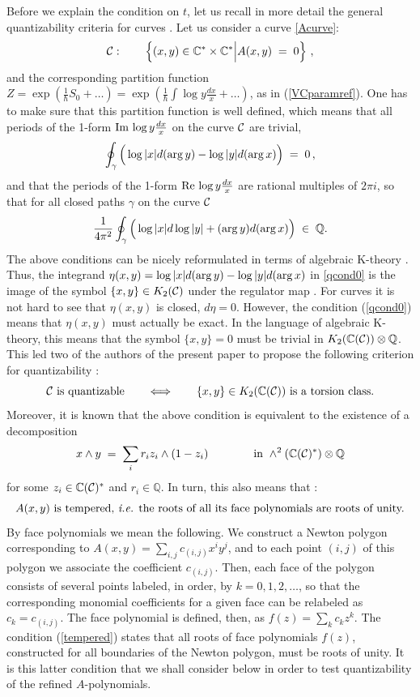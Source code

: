 \documentclass[hyper,letterpaper]{JHEP3}
\newcommand{\be}{\begin{equation}}
\newcommand{\ee}{\end{equation}}
\newcommand{\C}{{\mathbb C}}
\newcommand{\Q}{{\mathbb Q}}
\newcommand{\cC}{{\cal C }}
\begin{document}
Before we explain the condition on $t$, let us recall in more detail the general quantizability criteria for curves \cite{Apol}.
Let us consider a curve \eqref{Acurve}:
\be
\cC:\qquad \left\{(x,y)\in\mathbb{C}^*\times \mathbb{C}^*\Big|
A(x,y) \; = \; 0 \right\}\,,
\ee
and the corresponding partition function
$Z=\exp(\frac{1}{\hbar}S_0+\ldots)=\exp(\frac{1}{\hbar}\int \log y \frac{dx}{x}+\ldots)$, as in (\ref{VCparamref}).
One has to make sure that this partition function is well defined,
which means that all periods of the 1-form ${\rm Im} \, \log y \frac{dx}{x}$ on the curve $\cC$ are trivial,
\be
\oint_{\gamma} \Big( \log |x| d ({\rm arg} \, y) - \log |y| d ({\rm arg} \, x) \Big) \; = \; 0 \,,
\label{qcond0}
\ee
and that the periods of the 1-form ${\rm Re} \, \log y \frac{dx}{x}$ are rational multiples of $2 \pi i$,
so that for all closed paths $\gamma$ on the curve $\cC$
\be
\frac{1}{4 \pi^2} \oint_{\gamma} \Big( \log |x| d \log |y| + ({\rm arg} \, y) d ({\rm arg} \, x) \Big) \; \in \; \mathbb{Q} .
\label{qcondQ}
\ee
The above conditions can be nicely reformulated in terms of algebraic K-theory \cite{abmodel}.
Thus, the integrand $\eta(x,y)=\log |x| d ({\rm arg} \, y) - \log |y| d ({\rm arg} \, x)$
in \eqref{qcond0} is the image of the symbol $\{ x,y \} \in K_2 (\cC)$ under the regulator map \cite{Beilinson,Bloch}.
For curves it is not hard to see that $\eta(x,y)$ is closed, $d\eta=0$.
However, the condition (\ref{qcond0}) means that $\eta(x,y)$ must actually be exact.
In the language of algebraic K-theory, this means that the symbol $\{ x,y \} = 0$ must be trivial in $K_2 (\C (\cC)) \otimes \Q$.
This led two of the authors of the present paper to propose the following criterion for quantizability \cite{abmodel}:
\be
\cC~ \text{is quantizable} \qquad \Longleftrightarrow \qquad \{ x,y \} \in K_2 (\C (\cC)) ~\text{is a torsion class}.
\label{quantcritK2}
\ee
Moreover, it is known that the above condition is equivalent to the existence of a decomposition \cite{Fernando}
\be
x \wedge y \; = \; \sum_i r_i z_i \wedge (1 - z_i) \qquad \qquad {\rm in~} \wedge^2 (\C (\cC)^*) \otimes \Q
\label{qcondzz}
\ee
for some $z_i \in \C (\cC)^*$ and $r_i \in \Q$. In turn, this also means that \cite{Fernando}:
\be
\text{$A(x,y)$ is tempered, {\it i.e.} the roots of all its face polynomials are roots of unity.}   \label{tempered}
\ee
By face polynomials we mean the following. We construct a Newton polygon corresponding to $A(x,y)=\sum_{i,j} c_{(i,j)} x^i y^j$,
and to each point $(i,j)$ of this polygon we associate the coefficient $c_{(i,j)}$.
Then, each face of the polygon consists of several points labeled, in order, by $k=0,1,2,\ldots$,
so that the corresponding monomial coefficients for a given face can be relabeled as $c_k=c_{(i,j)}$.
The face polynomial is defined, then, as $f(z)=\sum_k c_k z^k$.
The condition (\ref{tempered}) states that all roots of face polynomials $f(z)$,
constructed for all boundaries of the Newton polygon, must be roots of unity.
It is this latter condition that we shall consider below in order to test quantizability of the refined $A$-polynomials.
\end{document}

